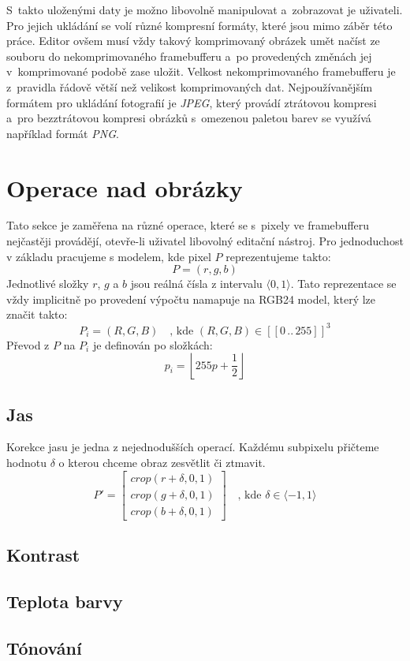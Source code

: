 \documentclass[11pt, a4paper, titlepage]{article}
\begin{document}
S~takto uloženými daty je možno libovolně manipulovat a~zobrazovat je uživateli.
Pro jejich ukládání se volí různé kompresní formáty, které jsou mimo záběr této práce.
Editor ovšem musí vždy takový komprimovaný obrázek umět načíst ze souboru do nekomprimovaného framebufferu a~po provedených změnách jej v~komprimované podobě zase uložit. Velkost nekomprimovaného  framebufferu je z~pravidla řádově větší než velikost komprimovaných dat.
Nejpoužívanějším formátem pro ukládání fotografií je \emph{JPEG}, který provádí ztrátovou kompresi a~pro bezztrátovou kompresi obrázků s~omezenou paletou barev se využívá například formát \emph{PNG}.

\section{Operace nad obrázky}
Tato sekce je zaměřena na různé operace, které se s~pixely ve framebufferu nejčastěji provádějí, otevře-li uživatel libovolný editační nástroj.
Pro jednoduchost v základu pracujeme s modelem, kde pixel $P$ reprezentujeme takto:
$$P = (r,g,b)$$
Jednotlivé složky $r$, $g$ a $b$ jsou reálná čísla z intervalu $\langle0,1\rangle$.
Tato reprezentace se vždy implicitně po provedení výpočtu namapuje na RGB24 model, který lze značit takto:
$$P_i=(R,G,B) \quad \text{, kde }(R,G,B) \in [\![0\,..\,255]\!]^3$$
Převod z $P$ na $P_i$ je definován po složkách:
$$p_i=\left\lfloor 255p+\dfrac{1}{2}\right\rfloor$$

\newpage
\subsection{Jas}
Korekce jasu je jedna z nejednodušších operací.
Každému subpixelu přičteme hodnotu $\delta$ o kterou chceme obraz zesvětlit či ztmavit.
$$
P' =
\begin{bmatrix}
    crop(r+\delta, 0, 1) \\
    crop(g+\delta, 0, 1) \\
    crop(b+\delta, 0, 1)
\end{bmatrix}
\quad
\text{, kde }\delta \in \langle-1,1\rangle
$$

\subsection{Kontrast}
\subsection{Teplota barvy}
\subsection{Tónování}
\end{document}
